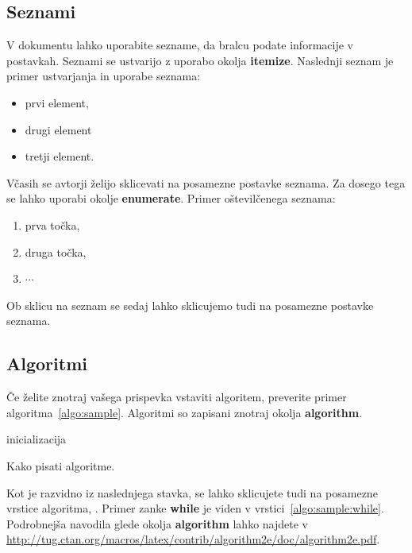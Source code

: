 \documentclass[article,slovene]{stucosrec}
\newcommand{\latexe}{\LaTeX$2_\epsilon$\xspace}
\begin{document}
	\subsection{Seznami}
	
	V dokumentu lahko uporabite sezname, da bralcu podate informacije v postavkah.
	Seznami se ustvarijo z uporabo okolja \textbf{itemize}.
	Naslednji seznam je primer ustvarjanja in uporabe seznama:
	
	\begin{itemize}
		\item prvi element,
		\item drugi element
		\item tretji element.
	\end{itemize}
	
	Včasih se avtorji želijo sklicevati na posamezne postavke seznama.
	Za dosego tega se lahko uporabi okolje \textbf{enumerate}.
	Primer oštevilčenega seznama:
	
	\begin{enumerate}
	    \item prva točka,
	    \item druga točka,
	    \item $\cdots$
	\end{enumerate}
	
	Ob sklicu na seznam se sedaj lahko sklicujemo tudi na posamezne postavke seznama.

	\subsection{Algoritmi}
	
	Če želite znotraj vašega prispevka vstaviti algoritem, preverite primer algoritma~\ref{algo:sample}.
	Algoritmi so zapisani znotraj okolja \textbf{algorithm}.
	
	\begin{algorithm}
		\SetAlgoLined
		\KwResult{kako pisati algoritme v \latexe}
		inicializacija\;
		\caption{Kako pisati algoritme.}
		\label{algo:sample}
	\end{algorithm}

	Kot je razvidno iz naslednjega stavka, se lahko sklicujete tudi na posamezne vrstice algoritma, .
	Primer zanke \textbf{while} je viden v vrstici~\ref{algo:sample:while}.
	Podrobnejša navodila glede okolja \textbf{algorithm} lahko najdete v \url{http://tug.ctan.org/macros/latex/contrib/algorithm2e/doc/algorithm2e.pdf}.
	
\end{document}
